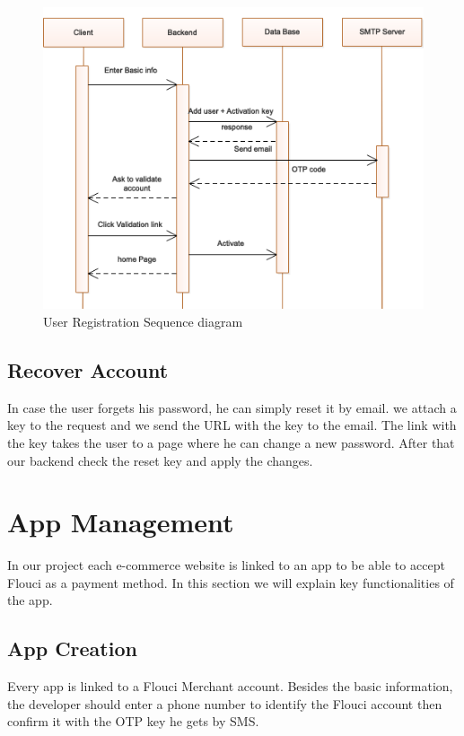 \begin{spacing}{1.2}
\begin{figure}[H]\centering
\includegraphics[scale=0.8]{Register_user_sequence_diagram.png}
\caption{User Registration Sequence diagram}
\label{fig:register}
\end{figure}



\subsection{Recover Account}
In case the user forgets his password, he can simply reset it by email. we attach a key to the request and we send the URL with the key to the email. The link with the key takes the user to a page where he can change a new password. After that our backend check the reset key and apply the changes.

\section{App Management}
In our project each e-commerce website is linked to an app to be able to accept Flouci as a payment method.
In this section we will explain key functionalities of the app.
\subsection{App Creation}
Every app is linked to a Flouci Merchant account. Besides the basic information, the developer should enter a phone number to identify the Flouci account then confirm it with the OTP key he gets by SMS.


\end{spacing}
